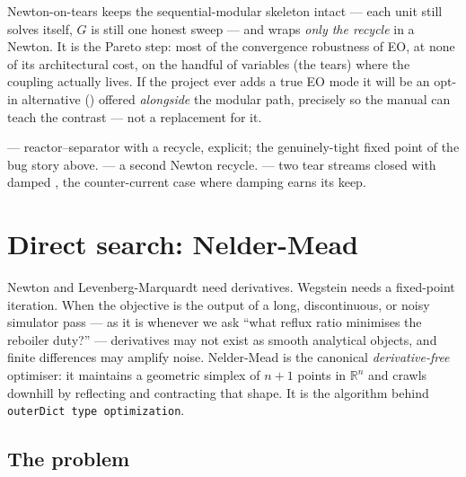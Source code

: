 \documentclass[11pt,a4paper]{article}
\begin{document}
Newton-on-tears keeps the sequential-modular skeleton intact --- each
unit still solves itself, $G$ is still one honest sweep --- and wraps
\emph{only the recycle} in a Newton.  It is the Pareto step: most of
the convergence robustness of EO, at none of its architectural cost,
on the handful of variables (the tears) where the coupling actually
lives.  If the project ever adds a true EO mode it will be an opt-in
alternative () offered \emph{alongside} the modular
path, precisely so the manual can teach the contrast --- not a
replacement for it.

\begin{tutoriallink}
 --- reactor--separator with
a recycle,  explicit; the genuinely-tight
fixed point of the bug story above.
 --- a second
Newton recycle.
 --- two tear
streams closed with damped , the
counter-current case where damping earns its keep.
\end{tutoriallink}

\section{Direct search: Nelder-Mead}\label{ch:nelder-mead}

\begin{whatyoulllearn}
Newton and Levenberg-Marquardt need derivatives.  Wegstein needs a
fixed-point iteration.  When the objective is the output of a long,
discontinuous, or noisy simulator pass --- as it is whenever we ask
``what reflux ratio minimises the reboiler duty?'' --- derivatives may
not exist as smooth analytical objects, and finite differences may
amplify noise.  Nelder-Mead is the canonical \emph{derivative-free}
optimiser: it maintains a geometric simplex of $n+1$ points in $\mathbb
R^n$ and crawls downhill by reflecting and contracting that shape.  It
is the algorithm behind \texttt{outerDict type optimization}.
\end{whatyoulllearn}

\subsection*{The problem}
\end{document}
